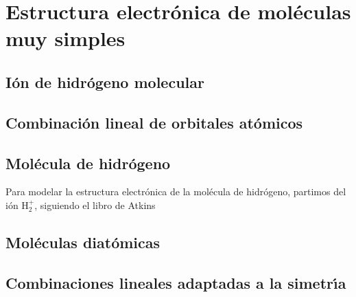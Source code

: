 \chapter{Estructura electr\'{o}nica de mol\'{e}culas muy simples}
\label{C:estr-electr-molec-simple}

\section{I\'{o}n de hidr\'{o}geno molecular}
\label{S:ion-de-hidrogeno}

\section{Combinaci\'{o}n lineal de orbitales at\'{o}micos}
\label{S:comb-line-orbit-atom}

\section{Mol\'{e}cula de hidr\'{o}geno}
\label{S:molec-de-hidr}

Para modelar la estructura electr\'{o}nica de la mol\'{e}cula de hidr\'{o}geno, partimos del i\'{o}n $\mathrm{H}_{2}^{+}$, siguiendo el libro de Atkins 

\section{Mol\'{e}culas diat\'{o}micas}
\label{S:moleculas-diatomicas}

\section{Combinaciones lineales adaptadas a la simetr\'{\i}a}
\label{S:comb-line-adapt}





